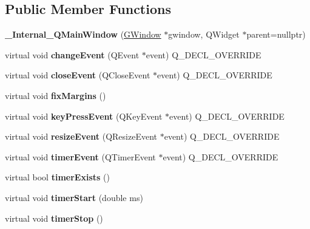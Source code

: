 \subsection*{Public Member Functions}
\begin{DoxyCompactItemize}
\item 
\mbox{\label{class__Internal__QMainWindow_aa6aed579504d0ef624f7ac0589c6ac99}} 
{\bfseries \+\_\+\+Internal\+\_\+\+Q\+Main\+Window} (\mbox{\hyperlink{classGWindow}{G\+Window}} $\ast$gwindow, Q\+Widget $\ast$parent=nullptr)
\item 
\mbox{\label{class__Internal__QMainWindow_a925812e35a2189d01af1b2b149c4bc5d}} 
virtual void {\bfseries change\+Event} (Q\+Event $\ast$event) Q\+\_\+\+D\+E\+C\+L\+\_\+\+O\+V\+E\+R\+R\+I\+DE
\item 
\mbox{\label{class__Internal__QMainWindow_a9530f2e9a989b29dfed60382fc6714ba}} 
virtual void {\bfseries close\+Event} (Q\+Close\+Event $\ast$event) Q\+\_\+\+D\+E\+C\+L\+\_\+\+O\+V\+E\+R\+R\+I\+DE
\item 
\mbox{\label{class__Internal__QMainWindow_ae75ad4dd07a00f49c4d10972d71f9b11}} 
virtual void {\bfseries fix\+Margins} ()
\item 
\mbox{\label{class__Internal__QMainWindow_a226a89124cfea36a69b62e87c76d709e}} 
virtual void {\bfseries key\+Press\+Event} (Q\+Key\+Event $\ast$event) Q\+\_\+\+D\+E\+C\+L\+\_\+\+O\+V\+E\+R\+R\+I\+DE
\item 
\mbox{\label{class__Internal__QMainWindow_af4ce2fdede7a58d286c47bd77ef08798}} 
virtual void {\bfseries resize\+Event} (Q\+Resize\+Event $\ast$event) Q\+\_\+\+D\+E\+C\+L\+\_\+\+O\+V\+E\+R\+R\+I\+DE
\item 
\mbox{\label{class__Internal__QMainWindow_a64b083d07a3c3de638cebcff1449434d}} 
virtual void {\bfseries timer\+Event} (Q\+Timer\+Event $\ast$event) Q\+\_\+\+D\+E\+C\+L\+\_\+\+O\+V\+E\+R\+R\+I\+DE
\item 
\mbox{\label{class__Internal__QMainWindow_a250a0b300ced30ab73ee381dc585a988}} 
virtual bool {\bfseries timer\+Exists} ()
\item 
\mbox{\label{class__Internal__QMainWindow_a4f56acb7724a0b14a3dd34fd670488d9}} 
virtual void {\bfseries timer\+Start} (double ms)
\item 
\mbox{\label{class__Internal__QMainWindow_ab81efa2ce0c79f4576c3e98ab6c561ce}} 
virtual void {\bfseries timer\+Stop} ()
\end{DoxyCompactItemize}
